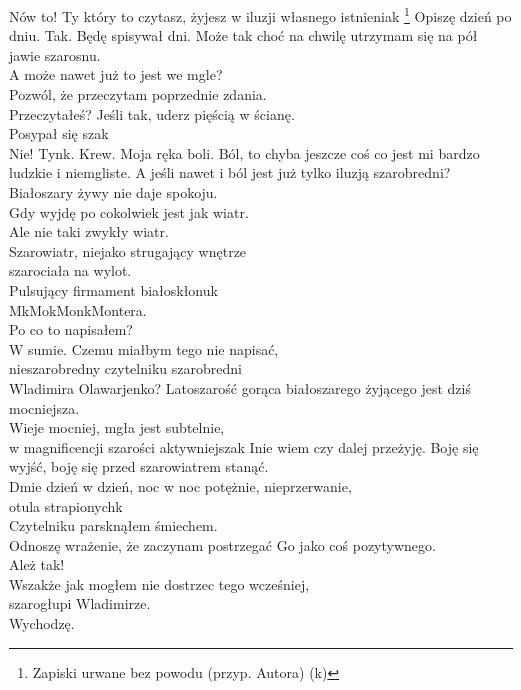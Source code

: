 \documentclass[../MAIN.tex]{subfiles}
\begin{document}
\qpi
% 
\spi
{N}{ów to! Ty który to czytasz, żyjesz w iluzji własnego istnienia\3k
\footnote{Zapiski urwane bez powodu (przyp. Autora) (\3k)}}
\qpi
% 
\spi
{O}{piszę dzień po dniu. Tak. Będę spisywał dni. Może tak choć na chwilę utrzymam się na pół jawie szarosnu.\\
A może nawet już to jest we mgle?\\
Pozwól, że przeczytam poprzednie zdania.\\
Przeczytałeś? Jeśli tak, uderz pięścią w ścianę. \\
Posypał się sza\3k \\
Nie! Tynk. Krew. Moja ręka boli.
Ból, to chyba jeszcze coś co jest mi bardzo ludzkie i niemgliste. A jeśli nawet i ból jest już tylko iluzją szarobredni?\\
Białoszary żywy nie daje spokoju. \\
Gdy wyjdę po cokolwiek jest jak wiatr.\\
Ale nie taki zwykły wiatr.\\
Szarowiatr, niejako strugający wnętrze\\
szarociała na wylot.\\
Pulsujący firmament białoskłonu\3k\\
M\3kMo\3kMon\3kMontera.\\
Po co to napisałem?\\
W sumie. Czemu miałbym tego nie napisać,\\
nieszarobredny czytelniku szarobredni\\
Wladimira Olawarjenko?}
\qpi
% 
\spi
{L}{atoszarość gorąca białoszarego żyjącego jest dziś mocniejsza.\\
Wieje mocniej, mgła jest subtelnie,\\
w magnificencji szarości aktywniejsza\3k}
\qpi
\spi
{I}{nie wiem czy dalej przeżyję. Boję się wyjść, boję się przed szarowiatrem stanąć.\\
Dmie dzień w dzień, noc w noc potężnie, nieprzerwanie,\\
otula strapionych\3k\\
Czytelniku parsknąłem śmiechem.\\
Odnoszę wrażenie,
że zaczynam postrzegać Go jako coś pozytywnego.\\
Ależ tak! \\
Wszakże jak mogłem nie dostrzec tego wcześniej,\\
szarogłupi Wladimirze.\\
Wychodzę.}
\qpi
\spi
\end{document}
